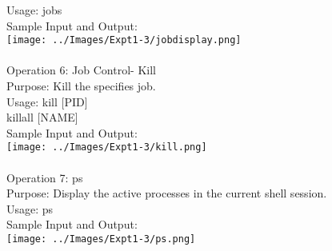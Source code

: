 \documentclass[10pt,a4paper]{report}
\begin{document}
Usage: jobs\\
Sample Input and Output:\\
\texttt{[image: ../Images/Expt1-3/jobdisplay.png]}\\
\\
Operation 6: Job Control- Kill\\
Purpose: Kill the specifies job.\\
Usage: kill [PID]\\
killall [NAME]\\
Sample Input and Output:\\
\texttt{[image: ../Images/Expt1-3/kill.png]}\\
\\
Operation 7: ps\\
Purpose: Display the active processes in the current shell session.\\
Usage: ps\\
Sample Input and Output:\\
\texttt{[image: ../Images/Expt1-3/ps.png]}\\
\\


\pagebreak
\end{document}

